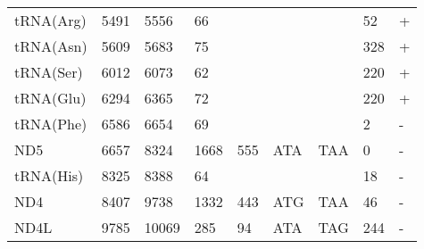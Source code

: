 \documentclass[../DISSERTACAO_MAIN.tex]{subfiles}
\begin{document}
\begin{longtable}{llllllllllllllllllllll}
			tRNA(Arg)    & 5491           & \multicolumn{2}{l}{5556}  & \multicolumn{2}{l}{66}         & \multicolumn{3}{l}{}                          & \multicolumn{3}{l}{}              & \multicolumn{3}{l}{}      & \multicolumn{3}{l}{52}          & \multicolumn{4}{l}{+}                  \\
			tRNA(Asn)    & 5609           & \multicolumn{2}{l}{5683}  & \multicolumn{2}{l}{75}         & \multicolumn{3}{l}{}                          & \multicolumn{3}{l}{}              & \multicolumn{3}{l}{}      & \multicolumn{3}{l}{328}         & \multicolumn{4}{l}{+}                  \\
			tRNA(Ser)    & 6012           & \multicolumn{2}{l}{6073}  & \multicolumn{2}{l}{62}         & \multicolumn{3}{l}{}                          & \multicolumn{3}{l}{}              & \multicolumn{3}{l}{}      & \multicolumn{3}{l}{220}         & \multicolumn{4}{l}{+}                  \\
			tRNA(Glu)    & 6294           & \multicolumn{2}{l}{6365}  & \multicolumn{2}{l}{72}         & \multicolumn{3}{l}{}                          & \multicolumn{3}{l}{}              & \multicolumn{3}{l}{}      & \multicolumn{3}{l}{220}         & \multicolumn{4}{l}{+}                  \\
			tRNA(Phe)    & 6586           & \multicolumn{2}{l}{6654}  & \multicolumn{2}{l}{69}         & \multicolumn{3}{l}{}                          & \multicolumn{3}{l}{}              & \multicolumn{3}{l}{}      & \multicolumn{3}{l}{2}           & \multicolumn{4}{l}{-}                  \\
			ND5          & 6657           & \multicolumn{2}{l}{8324}  & \multicolumn{2}{l}{1668}       & \multicolumn{3}{l}{555}                       & \multicolumn{3}{l}{ATA}           & \multicolumn{3}{l}{TAA}   & \multicolumn{3}{l}{0}           & \multicolumn{4}{l}{-}                  \\
			tRNA(His)    & 8325           & \multicolumn{2}{l}{8388}  & \multicolumn{2}{l}{64}         & \multicolumn{3}{l}{}                          & \multicolumn{3}{l}{}              & \multicolumn{3}{l}{}      & \multicolumn{3}{l}{18}          & \multicolumn{4}{l}{-}                  \\
			ND4          & 8407           & \multicolumn{2}{l}{9738}  & \multicolumn{2}{l}{1332}       & \multicolumn{3}{l}{443}                       & \multicolumn{3}{l}{ATG}           & \multicolumn{3}{l}{TAA}   & \multicolumn{3}{l}{46}          & \multicolumn{4}{l}{-}                  \\
			ND4L         & 9785           & \multicolumn{2}{l}{10069} & \multicolumn{2}{l}{285}        & \multicolumn{3}{l}{94}                        & \multicolumn{3}{l}{ATA}           & \multicolumn{3}{l}{TAG}   & \multicolumn{3}{l}{244}         & \multicolumn{4}{l}{-}                  \\

\end{longtable}
\end{document}
